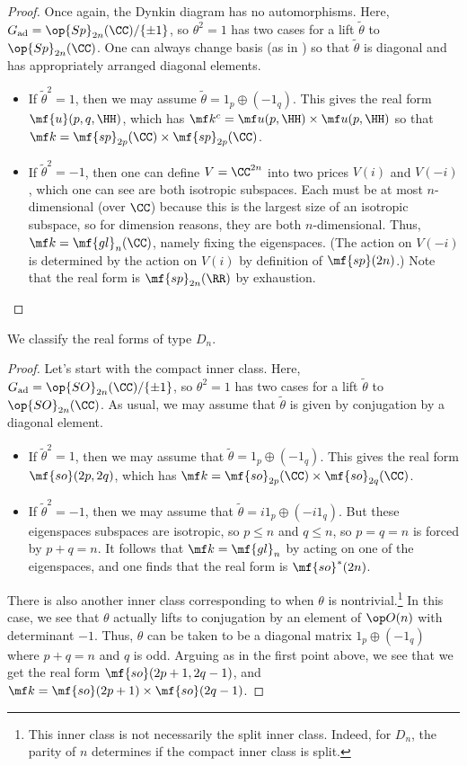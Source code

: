 \documentclass[../notes.tex]{subfiles}
\begin{document}
\begin{proof}
	Once again, the Dynkin diagram has no automorphisms. Here, $G_{\mathrm{ad}}=\op{Sp}_{2n}(\CC)/\{\pm1\}$, so $\theta^2=1$ has two cases for a lift $\widetilde\theta$ to $\op{Sp}_{2n}(\CC)$. One can always change basis (as in ) so that $\widetilde\theta$ is diagonal and has appropriately arranged diagonal elements.
	\begin{itemize}
		\item If $\widetilde\theta^2=1$, then we may assume $\widetilde\theta=1_p\oplus(-1_q)$. This gives the real form $\mf{u}(p,q,\HH)$, which has $\mf k^c=\mf u(p,\HH)\times\mf u(p,\HH)$ so that $\mf k=\mf{sp}_{2p}(\CC)\times\mf{sp}_{2p}(\CC)$.
		\item If $\widetilde\theta^2=-1$, then one can define $V=\CC^{2n}$ into two prices $V(i)$ and $V(-i)$, which one can see are both isotropic subspaces. Each must be at most $n$-dimensional (over $\CC$) because this is the largest size of an isotropic subspace, so for dimension reasons, they are both $n$-dimensional. Thus, $\mf k=\mf{gl}_n(\CC)$, namely fixing the eigenspaces. (The action on $V(-i)$ is determined by the action on $V(i)$ by definition of $\mf{sp}(2n)$.) Note that the real form is $\mf{sp}_{2n}(\RR)$ by exhaustion.
		\qedhere
	\end{itemize}
\end{proof}
\begin{exe}
	We classify the real forms of type $D_n$.
\end{exe}
\begin{proof}
	Let's start with the compact inner class. Here, $G_{\mathrm{ad}}=\op{SO}_{2n}(\CC)/\{\pm1\}$, so $\theta^2=1$ has two cases for a lift $\widetilde\theta$ to $\op{SO}_{2n}(\CC)$. As usual, we may assume that $\widetilde\theta$ is given by conjugation by a diagonal element.
	\begin{itemize}
		\item If $\widetilde\theta^2=1$, then we may assume that $\widetilde\theta=1_p\oplus(-1_q)$. This gives the real form $\mf{so}(2p,2q)$, which has $\mf k=\mf{so}_{2p}(\CC)\times\mf{so}_{2q}(\CC)$.
		\item If $\widetilde\theta^2=-1$, then we may assume that $\widetilde\theta=i1_p\oplus(-i1_q)$. But these eigenspaces subspaces are isotropic, so $p\le n$ and $q\le n$, so $p=q=n$ is forced by $p+q=n$. It follows that $\mf k=\mf{gl}_n$ by acting on one of the eigenspaces, and one finds that the real form is $\mf{so}^*(2n)$.
	\end{itemize}
	There is also another inner class corresponding to when $\theta$ is nontrivial.\footnote{This inner class is not necessarily the split inner class. Indeed, for $D_n$, the parity of $n$ determines if the compact inner class is split.} In this case, we see that $\theta$ actually lifts to conjugation by an element of $\op O(n)$ with determinant $-1$. Thus, $\theta$ can be taken to be a diagonal matrix $1_p\oplus(-1_q)$ where $p+q=n$ and $q$ is odd. Arguing as in the first point above, we see that we get the real form $\mf{so}(2p+1,2q-1)$, and $\mf k=\mf{so}(2p+1)\times\mf{so}(2q-1)$.
\end{proof}
\end{document}
